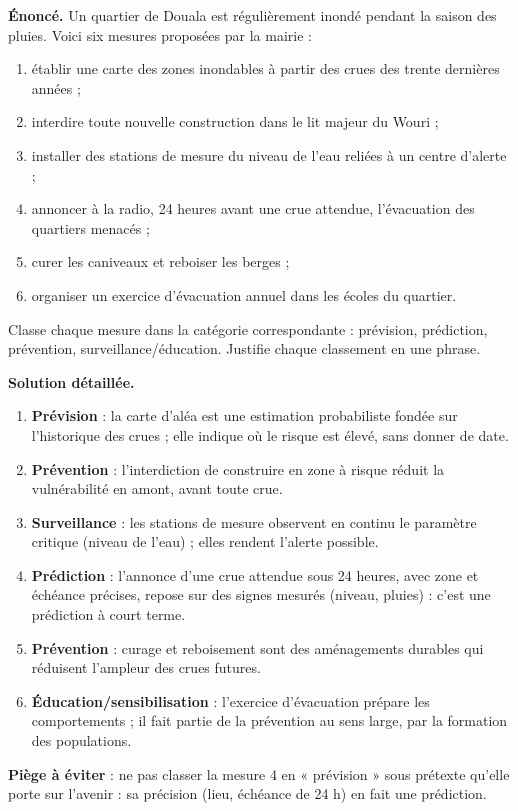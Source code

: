 \documentclass[11pt]{article}
\begin{document}
\begin{exoresolu}
\textbf{Énoncé.} Un quartier de Douala est régulièrement inondé pendant la saison des pluies. Voici six mesures proposées par la mairie :
\begin{enumerate}
\item établir une carte des zones inondables à partir des crues des trente dernières années ;
\item interdire toute nouvelle construction dans le lit majeur du Wouri ;
\item installer des stations de mesure du niveau de l'eau reliées à un centre d'alerte ;
\item annoncer à la radio, 24 heures avant une crue attendue, l'évacuation des quartiers menacés ;
\item curer les caniveaux et reboiser les berges ;
\item organiser un exercice d'évacuation annuel dans les écoles du quartier.
\end{enumerate}
Classe chaque mesure dans la catégorie correspondante : prévision, prédiction, prévention, surveillance/éducation. Justifie chaque classement en une phrase.

\tcblower
\textbf{Solution détaillée.}
\begin{enumerate}
\item \textbf{Prévision} : la carte d'aléa est une estimation probabiliste fondée sur l'historique des crues ; elle indique où le risque est élevé, sans donner de date.
\item \textbf{Prévention} : l'interdiction de construire en zone à risque réduit la vulnérabilité en amont, avant toute crue.
\item \textbf{Surveillance} : les stations de mesure observent en continu le paramètre critique (niveau de l'eau) ; elles rendent l'alerte possible.
\item \textbf{Prédiction} : l'annonce d'une crue attendue sous 24 heures, avec zone et échéance précises, repose sur des signes mesurés (niveau, pluies) : c'est une prédiction à court terme.
\item \textbf{Prévention} : curage et reboisement sont des aménagements durables qui réduisent l'ampleur des crues futures.
\item \textbf{Éducation/sensibilisation} : l'exercice d'évacuation prépare les comportements ; il fait partie de la prévention au sens large, par la formation des populations.
\end{enumerate}
\textbf{Piège à éviter} : ne pas classer la mesure 4 en « prévision » sous prétexte qu'elle porte sur l'avenir : sa précision (lieu, échéance de 24 h) en fait une prédiction.
\end{exoresolu}
\end{document}
